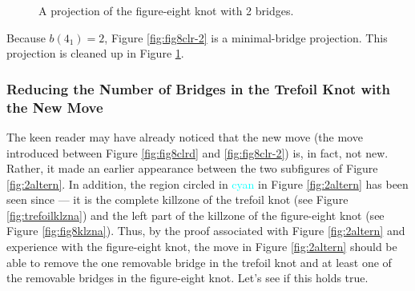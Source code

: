 \documentclass[titlepage,11pt]{article}
\begin{document}
\begin{figure}[h!]
    \centering
    \caption{A projection of the figure-eight knot with 2 bridges.}
    \label{fig:fig8fin}
\end{figure}

Because $b(4_1)=2$, Figure \ref{fig:fig8clr-2} is a minimal-bridge projection. This projection is cleaned up in Figure \ref{fig:fig8fin}.


\subsubsection{Reducing the Number of Bridges in the Trefoil Knot with the New Move}\label{ss2:trefoilreduce-2}
The keen reader may have already noticed that the new move (the move introduced between Figure \ref{fig:fig8clrd} and \ref{fig:fig8clr-2}) is, in fact, not new. Rather, it made an earlier appearance between the two subfigures of Figure \ref{fig:2altern}. In addition, the region circled in \textcolor{cyan}{cyan} in Figure \ref{fig:2altern} has been seen since --- it is the complete killzone of the trefoil knot (see Figure \ref{fig:trefoilklzna}) and the left part of the killzone of the figure-eight knot (see Figure \ref{fig:fig8klzna}). Thus, by the proof associated with Figure \ref{fig:2altern} and experience with the figure-eight knot, the move in Figure \ref{fig:2altern} should be able to remove the one removable bridge in the trefoil knot and at least one of the removable bridges in the figure-eight knot. Let's see if this holds true.\par
\end{document}
